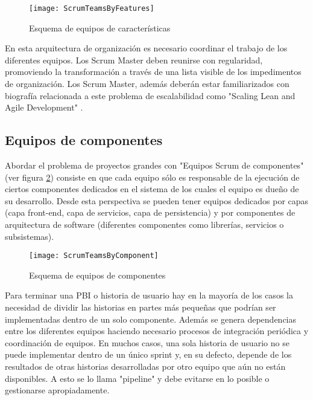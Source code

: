\begin{figure}[h]
  \centering
  \texttt{[image: ScrumTeamsByFeatures]}
  \caption{Esquema de equipos de características}
  \centering
  \label{fig:ScrumTeamsByFeatures} %
\end{figure}

En esta arquitectura de organización es necesario coordinar el trabajo de los diferentes equipos. Los Scrum Master deben reunirse con regularidad, promoviendo la transformación a través de una lista visible de los impedimentos de organización. Los Scrum Master, además deberán estar familiarizados con biografía relacionada a este problema de escalabilidad como "Scaling Lean and Agile Development" \cite{Larman-Vodde-2008}.

\subsection{Equipos de componentes}

Abordar el problema de proyectos grandes con "Equipos Scrum de componentes" (ver figura \ref{fig:ScrumTeamsByComponent}) consiste en que cada equipo sólo es responsable de la ejecución de ciertos componentes dedicados en el sistema de los cuales el equipo es dueño de su desarrollo. Desde esta perspectiva se pueden tener equipos dedicados por capas (capa front-end, capa de servicios, capa de persistencia) y por componentes de arquitectura de software (diferentes componentes como librerías, servicios o subsistemas).

\begin{figure}[h]
  \centering
  \texttt{[image: ScrumTeamsByComponent]}
  \caption{Esquema de equipos de componentes}
  \centering
  \label{fig:ScrumTeamsByComponent} %
\end{figure}

Para terminar una PBI o historia de usuario hay en la mayoría de los casos la necesidad de dividir las historias en partes más pequeñas que podrían ser implementadas dentro de un solo componente. Además se genera dependencias entre los diferentes equipos haciendo necesario procesos de integración periódica y coordinación de equipos. En muchos casos, una sola historia de usuario no se puede implementar dentro de un único sprint y, en su defecto, depende de los resultados de otras historias desarrolladas por otro equipo que aún no están disponibles. A esto se lo llama "pipeline" y debe evitarse en lo posible o gestionarse apropiadamente.

